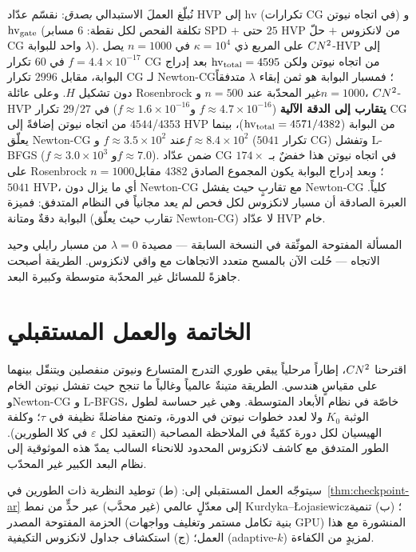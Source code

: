 نُبلّغ العملَ الاستبدالي \emph{بصدق}: نقسّم عدّاد HVP إلى $\mathrm{hv}$ (تكرارات CG في اتجاه
نيوتن) و$\mathrm{hv}_{\rm gate}$ (تكلفة الفحص لكل نقطة: $6$ مسابر SPD $+$ حتى $25$ HVP من
لانكزوس $+$ حلّ CG واحد للبوابة $\lambda$). على المربع ذي $\kappa{=}10^4$ في $n=1000$ يصل
$CN^2$-HVP إلى $f=4.4{\times}10^{-17}$ في $60$ تكرار CG من اتجاه نيوتن ولكن
$\mathrm{hv}_{\rm total}=4595$ بعد إدراج البوابة، مقابل $2996$ تكرار CG لـ Newton-CG؛
فمسبار البوابة هو ثمن إبقاء $\lambda$ متدفقاً دون تشكيل $H$. وعلى عائلة Rosenbrock غير
المحدّبة عند $n=500$ و$n=1000$، $CN^2$-HVP \textbf{يتقارب إلى الدقة الآلية}
($f\approx4.7{\times}10^{-16}$ و$f\approx1.6{\times}10^{-16}$) في $27$/$29$ تكرار CG من
اتجاه نيوتن إضافةً إلى $4544$/$4353$ HVP من البوابة ($\mathrm{hv}_{\rm total}=4571/4382$)،
بينما يعلّق Newton-CG عند $f\approx 3.5{\times}10^2$ و$f\approx 8.4{\times}10^2$
($5041$ تكرار CG) وتفشل L-BFGS ($f\approx 3.0{\times}10^3$ و$f\approx 7.0$). ضمن عدّاد
CG في اتجاه نيوتن هذا خفضٌ بـ $174\times$ على Rosenbrock $n=1000$؛ وبعد إدراج البوابة
يكون المجموع الصادق $4382$ مقابل $5041$ HVP، أي ما يزال دون Newton-CG مع تقاربٍ حيث
يفشل Newton-CG كلياً. العبرة الصادقة أن مسبار لانكزوس لكل فحص لم يعد مجانياً في النظام
المتدفق: فميزة البوابة دقةٌ ومتانة (تقارب حيث يعلّق Newton-CG) لا عدّاد HVP خام.

المسألة المفتوحة الموثّقة في النسخة السابقة — مصيدة $\lambda{=}0$ من مسبار رايلي
وحيد الاتجاه — حُلت الآن بالمسح متعدد الاتجاهات مع واقي لانكزوس. الطريقة أصبحت
جاهزةً للمسائل غير المحدّبة متوسطة وكبيرة البعد.

\section{الخاتمة والعمل المستقبلي}
\label{sec:concl-ar}

اقترحنا $CN^2$، إطاراً مرحلياً يبقي طوري التدرج المتسارع ونيوتن منفصلين ويتنقّل بينهما على
مقياسٍ هندسي. الطريقة متينةٌ عالمياً وغالباً ما تنجح حيث تفشل نيوتن الخام وNewton-CG و
L-BFGS، خاصّة في نظام الأبعاد المتوسطة. وهي غير حساسة لطول الوثبة $K_0$ ولا لعدد خطوات
نيوتن في الدورة، وتمنح مفاضلةً نظيفة في $\tau$؛ وكلفة الهيسيان لكل دورة كمّيةٌ في الملاحظة
المصاحبة (التعقيد لكل $\varepsilon$ في كلا الطورين). الطور المتدفق مع كاشف لانكزوس
المحدود للانحناء السالب يمدّ هذه الموثوقية إلى نظام البعد الكبير غير المحدّب.

سيتوجّه العمل المستقبلي إلى: (ط) توطيد النظرية ذات الطورين في~\ref{thm:checkpoint-ar} إلى
معدّلٍ عالمي (غير محدَّب) عبر حدٍّ من نمط Kurdyka--{\L}ojasiewicz؛ (ب) تنمية الحزمة
المفتوحة المصدر (بنية تكامل مستمر وتغليف وواجهات GPU) المنشورة مع هذا العمل؛ (ج)
استكشاف جداول لانكزوس التكيفية (\textenglish{adaptive-$k$}) لمزيدٍ من الكفاءة.

